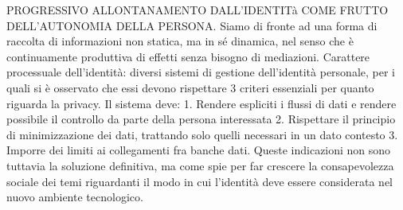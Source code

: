 PROGRESSIVO ALLONTANAMENTO DALL’IDENTITà COME FRUTTO DELL’AUTONOMIA DELLA PERSONA.
Siamo di fronte ad una forma di raccolta di informazioni non statica, ma in sé dinamica, nel senso che è continuamente produttiva di effetti senza bisogno di mediazioni.
Carattere processuale dell’identità: diversi sistemi di gestione dell’identità personale, per i quali si è osservato che essi devono rispettare 3 criteri essenziali per quanto riguarda la privacy. Il sistema deve:
1.	Rendere espliciti i flussi di dati e rendere possibile il controllo da parte della persona interessata
2.	Rispettare il principio di minimizzazione dei dati, trattando solo quelli necessari in un dato contesto
3.	Imporre dei limiti ai collegamenti fra banche dati.
Queste indicazioni non sono tuttavia la soluzione definitiva, ma come spie per far crescere la consapevolezza sociale dei temi riguardanti il modo in cui l’identità deve essere considerata nel nuovo ambiente tecnologico.


